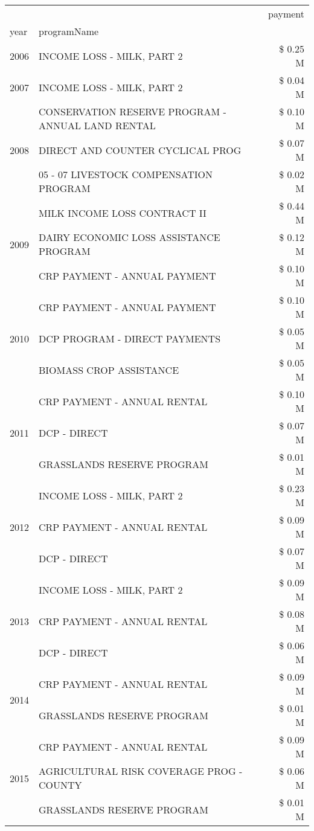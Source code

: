 \begin{tabular}{llr}
\toprule
 &  & payment \\
year & programName &  \\
\midrule
2006 & INCOME LOSS - MILK, PART 2 & \$ 0.25 M \\
\cline{1-3}
2007 & INCOME LOSS - MILK, PART 2 & \$ 0.04 M \\
\cline{1-3}
\multirow[t]{3}{*}{2008} & CONSERVATION RESERVE PROGRAM - ANNUAL LAND RENTAL & \$ 0.10 M \\
 & DIRECT AND COUNTER CYCLICAL PROG & \$ 0.07 M \\
 & 05 - 07 LIVESTOCK COMPENSATION PROGRAM & \$ 0.02 M \\
\cline{1-3}
\multirow[t]{3}{*}{2009} & MILK INCOME LOSS CONTRACT II & \$ 0.44 M \\
 & DAIRY ECONOMIC LOSS ASSISTANCE PROGRAM & \$ 0.12 M \\
 & CRP PAYMENT - ANNUAL PAYMENT & \$ 0.10 M \\
\cline{1-3}
\multirow[t]{3}{*}{2010} & CRP PAYMENT - ANNUAL PAYMENT & \$ 0.10 M \\
 & DCP PROGRAM - DIRECT PAYMENTS & \$ 0.05 M \\
 & BIOMASS CROP ASSISTANCE & \$ 0.05 M \\
\cline{1-3}
\multirow[t]{3}{*}{2011} & CRP PAYMENT - ANNUAL RENTAL & \$ 0.10 M \\
 & DCP - DIRECT & \$ 0.07 M \\
 & GRASSLANDS RESERVE PROGRAM & \$ 0.01 M \\
\cline{1-3}
\multirow[t]{3}{*}{2012} & INCOME LOSS - MILK, PART 2 & \$ 0.23 M \\
 & CRP PAYMENT - ANNUAL RENTAL & \$ 0.09 M \\
 & DCP - DIRECT & \$ 0.07 M \\
\cline{1-3}
\multirow[t]{3}{*}{2013} & INCOME LOSS - MILK, PART 2 & \$ 0.09 M \\
 & CRP PAYMENT - ANNUAL RENTAL & \$ 0.08 M \\
 & DCP - DIRECT & \$ 0.06 M \\
\cline{1-3}
\multirow[t]{2}{*}{2014} & CRP PAYMENT - ANNUAL RENTAL & \$ 0.09 M \\
 & GRASSLANDS RESERVE PROGRAM & \$ 0.01 M \\
\cline{1-3}
\multirow[t]{3}{*}{2015} & CRP PAYMENT - ANNUAL RENTAL & \$ 0.09 M \\
 & AGRICULTURAL RISK COVERAGE PROG - COUNTY & \$ 0.06 M \\
 & GRASSLANDS RESERVE PROGRAM & \$ 0.01 M \\

\end{tabular}
